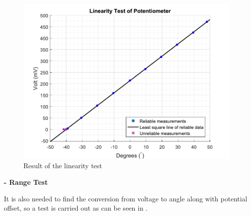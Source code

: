 \begin{figure}[H] 
	\centering 
	\includegraphics[scale=0.5]{figures/linearityOfPotmeterTest2-1}
	\caption{Result of the linearity test}
	\label{linearityOfPotmeterTest}
\end{figure}

\textbf{- Range Test}

It is also needed to find the conversion from voltage to angle along with potential offset, so a test is carried out as can be seen in .

